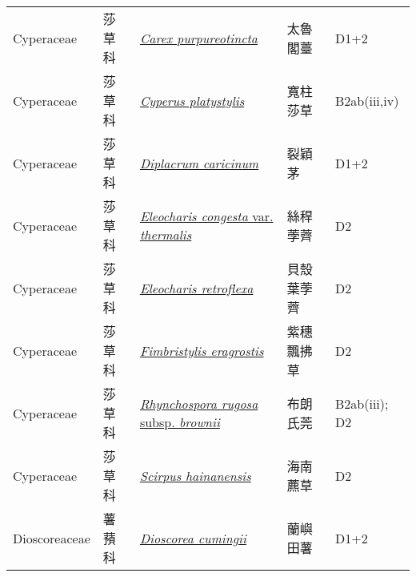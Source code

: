 {\begin{longtable}{L{2.5cm}L{2cm}L{5cm}L{2.5cm}L{3cm}}
    Cyperaceae & 莎草科 & \href{http://www.theplantlist.org/tpl1.1/search?q=Carex+purpureotincta}{\textit{Carex purpureotincta} } & 太魯閣薹 & D1+2    \\
    Cyperaceae & 莎草科 & \href{http://www.theplantlist.org/tpl1.1/search?q=Cyperus+platystylis}{\textit{Cyperus platystylis} } & 寬柱莎草 & B2ab(iii,iv)    \\
    Cyperaceae & 莎草科 & \href{http://www.theplantlist.org/tpl1.1/search?q=Diplacrum+caricinum}{\textit{Diplacrum caricinum} } & 裂穎茅 & D1+2    \\
    Cyperaceae & 莎草科 & \href{http://www.theplantlist.org/tpl1.1/search?q=Eleocharis+congesta+var.+thermalis}{\textit{Eleocharis congesta} var. \textit{thermalis} } & 絲稈荸薺 & D2    \\
    Cyperaceae & 莎草科 & \href{http://www.theplantlist.org/tpl1.1/search?q=Eleocharis+retroflexa}{\textit{Eleocharis retroflexa} } & 貝殼葉荸薺 & D2    \\
    Cyperaceae & 莎草科 & \href{http://www.theplantlist.org/tpl1.1/search?q=Fimbristylis+eragrostis}{\textit{Fimbristylis eragrostis} } & 紫穗飄拂草 & D2    \\
    Cyperaceae & 莎草科 & \href{http://www.theplantlist.org/tpl1.1/search?q=Rhynchospora+rugosa+subsp.+brownii}{\textit{Rhynchospora rugosa} subsp. \textit{brownii} } & 布朗氏莞 & B2ab(iii); D2    \\
    Cyperaceae & 莎草科 & \href{http://www.theplantlist.org/tpl1.1/search?q=Scirpus+hainanensis}{\textit{Scirpus hainanensis} } & 海南藨草 & D2    \\
    Dioscoreaceae & 薯蕷科 & \href{http://www.theplantlist.org/tpl1.1/search?q=Dioscorea+cumingii}{\textit{Dioscorea cumingii} } & 蘭嶼田薯 & D1+2    \\

\end{longtable}}
